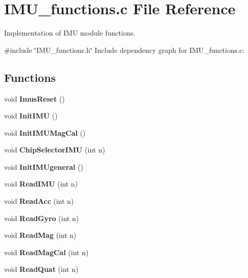 \section{I\+M\+U\+\_\+functions.\+c File Reference}
\label{_i_m_u__functions_8c}


Implementation of I\+MU module functions.  


{\ttfamily \#include \char`\"{}I\+M\+U\+\_\+functions.\+h\char`\"{}}\newline
Include dependency graph for I\+M\+U\+\_\+functions.\+c\+:
\subsection*{Functions}
\begin{DoxyCompactItemize}
\item 
\mbox{\label{_i_m_u__functions_8c_a950a5a57e4188823c580d054ed2db16a}} 
void {\bfseries Imus\+Reset} ()
\item 
\mbox{\label{_i_m_u__functions_8c_ac4f81f61837e6a132dfceb5bb93b06fa}} 
void {\bfseries Init\+I\+MU} ()
\item 
\mbox{\label{_i_m_u__functions_8c_ac95975151b543b5265bc1e470aabf465}} 
void {\bfseries Init\+I\+M\+U\+Mag\+Cal} ()
\item 
\mbox{\label{_i_m_u__functions_8c_afae3632c7d21d6a41f6999eaabf7de07}} 
void {\bfseries Chip\+Selector\+I\+MU} (int n)
\item 
\mbox{\label{_i_m_u__functions_8c_a83f0630cb5ff556322c8cf56b6c6afc0}} 
void {\bfseries Init\+I\+M\+Ugeneral} ()
\item 
\mbox{\label{_i_m_u__functions_8c_a45df9ddb73de250cebfa02bf1d72bd97}} 
void {\bfseries Read\+I\+MU} (int n)
\item 
\mbox{\label{_i_m_u__functions_8c_a0290185f5b71ddb96ea13ce0a1ff48e7}} 
void {\bfseries Read\+Acc} (int n)
\item 
\mbox{\label{_i_m_u__functions_8c_ab8ae2a28912ce4a548b3603e86b22ae9}} 
void {\bfseries Read\+Gyro} (int n)
\item 
\mbox{\label{_i_m_u__functions_8c_a2ee29250f51422fa3d76df77335cce26}} 
void {\bfseries Read\+Mag} (int n)
\item 
\mbox{\label{_i_m_u__functions_8c_aad3b4856a76c623025484fe5b931bdd4}} 
void {\bfseries Read\+Mag\+Cal} (int n)
\item 
\mbox{\label{_i_m_u__functions_8c_a8eeecefb2efe7e01711fb9448c31ae76}} 
void {\bfseries Read\+Quat} (int n)
\item 

\end{DoxyCompactItemize}
